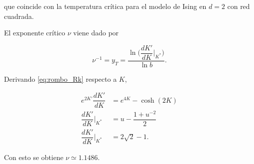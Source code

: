 \documentclass[10pt]{article}
\begin{document}
que coincide con la temperatura cr\'itica para el modelo de Ising en $d=2$ con red cuadrada.

El exponente cr\'itico $\nu$ viene dado por 

\begin{equation}
\nu^{-1} = y_T = \dfrac{\ln\bigg(\dfrac{dK'}{dK}\bigg\rvert_{K^*} \bigg)}{\ln b}.
\end{equation}

Derivando \ref{eq:rombo_Rk} respecto a $K$,

\begin{align}
e^{2K'} \dfrac{dK'}{dK} &= e^{4K} - \cosh(2K) \\
\dfrac{dK'}{dK}\bigg\rvert_{K^*} &= u - \dfrac{1+u^{-2}}{2}\\
\dfrac{dK'}{dK}\bigg\rvert_{K^*} &= 2\sqrt{2}-1.
\end{align}

Con esto se obtiene $\nu \simeq 1.1486$.
 
\end{document}
